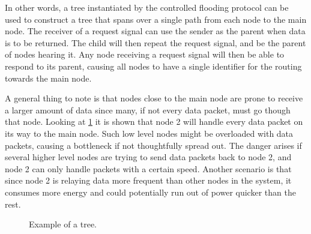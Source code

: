 In other words, a tree instantiated by the controlled flooding protocol can be used to construct a tree that spans over a single path from each node to the main node.
The receiver of a request signal can use the sender as the parent when data is to be returned.
The child will then repeat the request signal, and be the parent of nodes hearing it.
Any node receiving a request signal will then be able to respond to its parent, causing all nodes to have a single identifier for the routing towards the main node.

A general thing to note is that nodes close to the main node are prone to receive a larger amount of data since many, if not every data packet, must go though that node. Looking at \ref{fig:overloadtree} it is shown that node 2 will handle every data packet on its way to the main node. Such low level nodes might be overloaded with data packets, causing a bottleneck if not thoughtfully spread out. The danger arises if several higher level nodes are trying to send data packets back to node 2, and node 2 can only handle packets with a certain speed. Another scenario is that since node 2 is relaying data more frequent than other nodes in the system, it consumes more energy and could potentially run out of power quicker than the rest.
\begin{figure}[!h]
	\centering
	\caption{Example of a tree.}
	\label{fig:overloadtree}
\end{figure}

